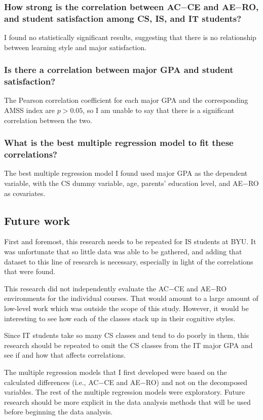 \subsubsection{How strong is the correlation between AC$-$CE and AE$-$RO, and student satisfaction among CS, IS, and IT students?}
I found no statistically significant results, suggesting that there is no relationship between learning style and major satisfaction.

\subsubsection{Is there a correlation between major GPA and student satisfaction?}
The Pearson correlation coefficient for each major GPA and the corresponding AMSS index are $p>0.05$, so I am unable to say that there is a significant correlation between the two.

\subsubsection{What is the best multiple regression model to fit these correlations?}
The best multiple regression model I found used major GPA as the dependent variable, with the CS dummy variable, age, parents' education level, and AE$-$RO as covariates.

\subsection{Future work}
First and foremost, this research needs to be repeated for IS students at BYU. It was unfortunate that so little data was able to be gathered, and adding that dataset to this line of research is necessary, especially in light of the correlations that were found.

This research did not independently evaluate the AC$-$CE and AE$-$RO environments for the individual courses. That would amount to a large amount of low-level work which was outside the scope of this study. However, it would be interesting to see how each of the classes stack up in their cognitive styles.

Since IT students take so many CS classes and tend to do poorly in them, this research should be repeated to omit the CS classes from the IT major GPA and see if and how that affects correlations.

The multiple regression models that I first developed were based on the calculated differences (i.e., AC$-$CE and AE$-$RO) and not on the decomposed variables. The rest of the multiple regression models were exploratory. Future research should be more explicit in the data analysis methods that will be used before beginning the data analysis.


